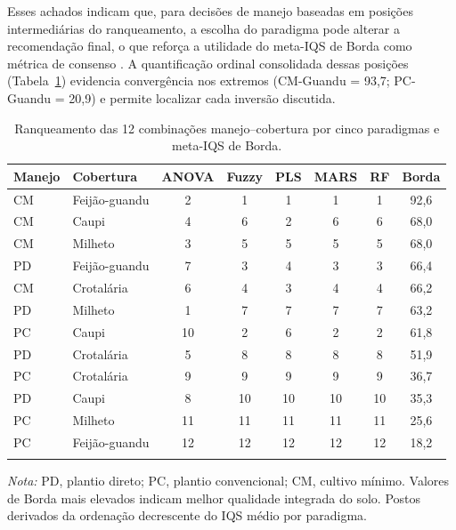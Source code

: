 \documentclass[pdflatex,sn-basic]{sn-jnl}%
\begin{document}
Esses achados indicam que, para decisões de manejo baseadas em posições intermediárias do ranqueamento, a escolha do paradigma pode alterar a recomendação final, o que reforça a utilidade do meta-IQS de Borda como métrica de consenso \citep{Lin2010}. A quantificação ordinal consolidada dessas posições (Tabela~\ref{tab:ranking}) evidencia convergência nos extremos (CM-Guandu = 93,7; PC-Guandu = 20,9) e permite localizar cada inversão discutida.

\begin{table}[ht]
\caption{Ranqueamento das 12 combinações manejo--cobertura por cinco paradigmas e meta-IQS de Borda.}\label{tab:ranking}
\begin{tabular*}{\textwidth}{@{\extracolsep\fill}llcccccc}
\toprule
Manejo & Cobertura & ANOVA & Fuzzy & PLS & MARS & RF & Borda \\
\midrule
CM & Feijão-guandu & 2 & 1 & 1 & 1 & 1 & 92,6 \\
CM & Caupi         & 4 & 6 & 2 & 6 & 6 & 68,0 \\
CM & Milheto       & 3 & 5 & 5 & 5 & 5 & 68,0 \\
PD & Feijão-guandu & 7 & 3 & 4 & 3 & 3 & 66,4 \\
CM & Crotalária    & 6 & 4 & 3 & 4 & 4 & 66,2 \\
PD & Milheto       & 1 & 7 & 7 & 7 & 7 & 63,2 \\
PC & Caupi         &10 & 2 & 6 & 2 & 2 & 61,8 \\
PD & Crotalária    & 5 & 8 & 8 & 8 & 8 & 51,9 \\
PC & Crotalária    & 9 & 9 & 9 & 9 & 9 & 36,7 \\
PD & Caupi         & 8 &10 &10 &10 &10 & 35,3 \\
PC & Milheto       &11 &11 &11 &11 &11 & 25,6 \\
PC & Feijão-guandu &12 &12 &12 &12 &12 & 18,2 \\
\botrule
\end{tabular*}
\smallskip\noindent\textit{Nota:} PD, plantio direto; PC, plantio convencional; CM, cultivo mínimo. Valores de Borda mais elevados indicam melhor qualidade integrada do solo. Postos derivados da ordenação decrescente do IQS médio por paradigma.
\end{table}
\end{document}
